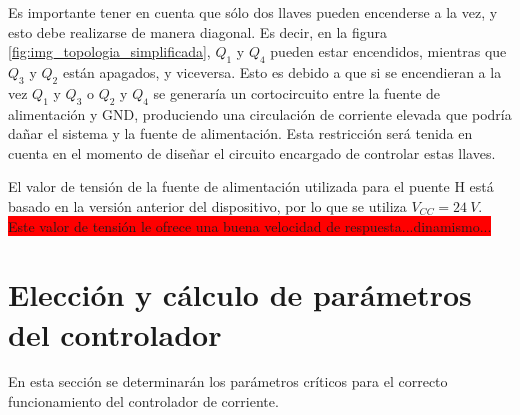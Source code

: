 Es importante tener en cuenta que sólo dos llaves pueden encenderse a la vez, y esto debe realizarse de manera diagonal. Es decir, en la figura \ref{fig:img_topologia_simplificada}, $Q_1$ y $Q_4$ pueden estar encendidos, mientras que $Q_3$ y $Q_2$ están apagados, y viceversa. Esto es debido a que si se encendieran a la vez  $Q_1$ y $Q_3$ o  $Q_2$ y $Q_4$ se generaría un cortocircuito entre la fuente de alimentación y GND, produciendo una circulación de corriente elevada que podría dañar el sistema y la fuente de alimentación. Esta restricción será tenida en cuenta en el momento de diseñar el circuito encargado de controlar estas llaves.

El valor de tensión de la fuente de alimentación utilizada para el puente H está basado en la versión anterior del dispositivo, por lo que se utiliza $V_{CC} = 24\:V$. \colorbox{red}{Este valor de tensión le ofrece una buena velocidad de respuesta...dinamismo...}

\section{Elección y cálculo de parámetros del controlador}

En esta sección se determinarán los parámetros críticos para el correcto funcionamiento del controlador de corriente.




